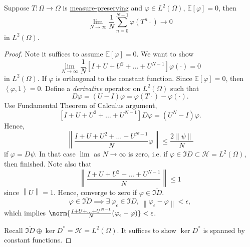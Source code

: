 \begin{proposition}
	Suppose \(T\colon \Omega \to \Omega\) is \hyperref[def:measure-preserving]{measure-preserving} and \(\varphi \in L^2(\Omega)\), \(\mathbb{E}\left[\varphi \right] = 0\), then
	\[
		\lim\limits_{N \to \infty} \frac{1}{N} \sum_{n = 0}^{N - 1} \varphi(T^n \cdot) \to 0
	\]
	in \(L^2(\Omega)\).
\end{proposition}
\begin{proof}
	Note it suffices to assume \(\mathbb{E}\left[\varphi \right] = 0\). We want to show
	\[
		\lim_{N \to \infty} \frac{1}{N} [I + U + U^2 + \ldots + U^{N-1}] \varphi(\cdot) = 0
	\]
	in \(L^2(\Omega)\). If \(\varphi\) is orthogonal to the constant function. Since \(\mathbb{E}\left[\varphi \right] = 0\), then \(\left\langle \varphi, 1 \right\rangle  = 0\). Define a \emph{derivative} operator on \(L^2(\Omega)\) such that
	\[
		D \varphi = (U - I) \varphi = \varphi(T \cdot) - \varphi(\cdot).
	\]
	Use Fundamental Theorem of Calculus argument,
	\[
		[I + U + U^2 + \ldots + U^{N-1}] D\varphi = (U^N - I) \varphi.
	\]
	Hence,
	\[
		\left\lVert \frac{I + U + U^2 + \ldots + U^{N-1}}{N} \varphi\right\rVert \leq \frac{2 \left\lVert \psi\right\rVert }{N}
	\]
	if \(\varphi = D \psi\). In that case \(\lim\) as \(N \to \infty\) is zero, i.e. if \(\varphi \in \Im{D} \subset \mathcal{H} = L^2(\Omega)\), then finished. Note also that
	\[
		\left\lVert \frac{I + U + U^2 + \ldots + U^{N-1}}{N}\right\rVert \leq 1
	\]
	since \(\left\lVert U\right\rVert = 1\). Hence, converge to zero if \(\varphi \in \overline{\Im{D}}\).
	\[
		\varphi \in \overline{\Im{D}} \implies \exists\ \varphi_\epsilon \in \Im{D},\ \left\lVert \varphi_\epsilon - \varphi\right\rVert  < \epsilon,
	\]
	which implies \(\norm{\frac{I + U + \ldots + U^{N-1}}{N} (\varphi_\epsilon - \varphi)} < \epsilon\).

	Recall \(\overline{\Im{D}} \oplus \ker{D^{\ast}} = \mathcal{H} = L^2(\Omega)\). It suffices to show \(\ker{D^{\ast}}\) is spanned by constant functions.


\end{proof}
